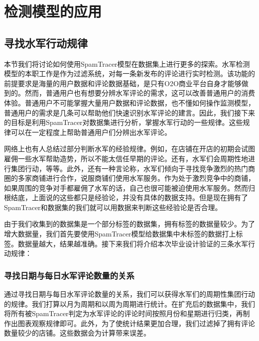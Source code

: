 

\chapter{检测模型的应用}
\label{chap:appli}




\section{寻找水军行动规律}

本节我们将讨论如何使用SpamTracer模型在数据集上进行更多的探索。水军检测模型的本职工作是作为过滤系统，对每一条新发布的评论进行实时检测。该功能的前提要求是海量的用户数据和评论数据基础，是只有O2O商业平台自身才能够做到的。然而，普通用户也有想要分辨水军评论的需求，这可以改善普通用户的消费体验。普通用户不可能掌握大量用户数据和评论数据，也不懂如何操作监测模型，普通用户的需求是几条可以帮助他们快速识别水军评论的建言。因此，我们接下来的目标是利用SpamTracer对数据集进行分析，掌握水军行动的一些规律。这些规律可以在一定程度上帮助普通用户们分辨出水军评论。

网络上也有人总结过部分判断水军的经验规律。例如，在店铺在开店的初期会试图雇佣一些水军帮助造势，所以不能太信任早期的评论。还有，水军们会周期性地进行集团行动，等等。此外，还有一种言论称，水军们倾向于寻找竞争激烈的热门商圈的多家商铺进行合作，说服商铺们使用水军服务。作为处于激烈竞争中的商铺，如果周围的竞争对手都雇佣了水军的话，自己也很可能被迫使用水军服务。然而归根结底，上面说的这些都只是经验论，并没有具体的数据支持。但是现在拥有了SpamTracer和数据集的我们就可以用数据来判断这些经验论是否合理。

由于我们收集到的数据集是一个部分标签的数据集，拥有标签的数据量较少。为了增大数据量，我们首先要使用SpamTracer模型给数据集中未标签的数据打上标签。数据量越大，结果越准确。接下来我们将介绍本次毕业设计验证的三条水军行动规律：


\subsection{寻找日期与每日水军评论数量的关系}

通过寻找日期与每日水军评论数量的关系，我们可以获得水军们的周期性集团行动的规律。我们打算以月为周期和以周为周期进行统计。在扩充后的数据集中，我们将所有被SpamTracer判定为水军评论的评论时间按照月份和星期进行归类，再制作出图表观察规律即可。此外，为了使统计结果更加合理，我们过滤掉了拥有评论数量较少的店铺。这些数据会为计算带来误差。



